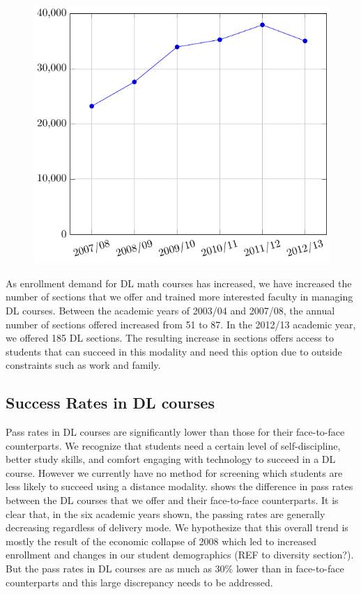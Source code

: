 \begin{figure}[!htb]
\begin{minipage}{.5\textwidth}
          \includegraphics[width=\textwidth]{graphics/enrollmentInF2F.pdf}
    \end{minipage}
\end{figure}


As enrollment demand for DL math courses has increased, we have increased the number of sections that we offer and trained more interested faculty in managing DL courses.  Between the academic years of 2003/04 and 2007/08, the annual number of sections offered increased from 51 to 87.  In the 2012/13 academic year, we offered 185 DL sections.   The resulting increase in sections offers access to students that can succeed in this modality and need this option due to outside constraints such as work and family.


\subsection{Success Rates in DL courses}
Pass rates in DL courses are significantly lower than those for their face-to-face counterparts. We recognize that students need a certain level of self-discipline, better study skills, and comfort engaging with technology to succeed in a DL course. However we currently have no method for screening which students are less likely to succeed using a distance modality.   shows the difference in pass rates between the DL courses that we offer and their face-to-face counterparts.  It is clear that, in the six academic years shown, the passing rates are generally decreasing regardless of delivery mode.  We hypothesize that this overall trend is mostly the result of the economic collapse of 2008 which led to increased enrollment and changes in our student demographics (REF to diversity section?).  But the pass rates in DL courses are as much as 30\% lower than in face-to-face counterparts and this large discrepancy needs to be addressed.

